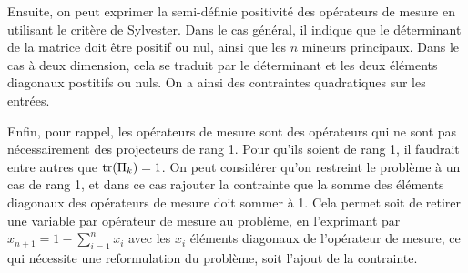 Ensuite, on peut exprimer la semi-définie positivité des opérateurs de mesure en utilisant le critère de Sylvester. Dans le cas général, il indique que le déterminant de la matrice doit être positif ou nul, ainsi que les $n$ mineurs principaux. Dans le cas à deux dimension, cela se traduit par le déterminant et les deux éléments diagonaux postitifs ou nuls. On a ainsi des contraintes quadratiques sur les entrées.

Enfin, pour rappel, les opérateurs de mesure sont des opérateurs qui ne sont pas nécessairement des projecteurs de rang 1. Pour qu'ils soient de rang 1, il faudrait entre autres que $\operatorname{tr}(\Pi_k) = 1$. On peut considérer qu'on restreint le problème à un cas de rang 1, et dans ce cas rajouter la contrainte que la somme des éléments diagonaux des opérateurs de mesure doit sommer à 1. Cela permet soit de retirer une variable par opérateur de mesure au problème, en l'exprimant par $x_{n+1} = 1 - \displaystyle \sum_{i=1}^{n} x_i$ avec les $x_i$ éléments diagonaux de l'opérateur de mesure, ce qui nécessite une reformulation du problème, soit l'ajout de la contrainte.

\medbreak




